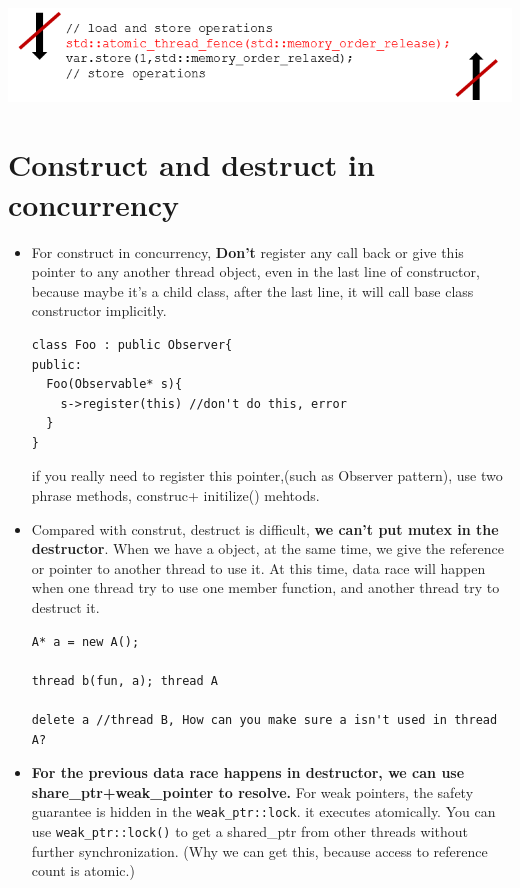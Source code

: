 \documentclass[a4paper,11pt,twoside]{book}
\begin{document}
\begin{itemize}
\begin{enumerate}
		\begin{center}
			\includegraphics[width=0.74\linewidth]{pics/release2.png}
		\end{center}
	\end{enumerate}
	
\end{itemize}


\section{Construct and destruct in concurrency}
\begin{itemize}

	\item For construct in concurrency, \textbf{Don't} register any call back or give this pointer to any another thread object, even in the last line of constructor, because maybe it's a child class, after the last line, it will call base class constructor implicitly.
\begin{lstlisting}
class Foo : public Observer{
public:
  Foo(Observable* s){
    s->register(this) //don't do this, error
  }
}
\end{lstlisting}
if you really need to register this pointer,(such as Observer pattern),  use two phrase methods, construc+ initilize() mehtods.

    \item Compared with construt, destruct is difficult, \textbf{we can't put mutex in the destructor}. When we have a object, at the same time, we give the reference or pointer to another thread to use it. At this time, data race will happen when one thread try to use one member function, and another thread try to destruct it. 
\begin{lstlisting}[]
A* a = new A();

thread b(fun, a); thread A

delete a //thread B, How can you make sure a isn't used in thread A? 
\end{lstlisting}

	\item \textbf{For the previous data race happens in destructor, we can use share\_ptr+weak\_pointer to resolve.} For weak pointers, the safety guarantee is hidden in the \texttt{weak\_ptr::lock}. it executes atomically.  You can use \texttt{weak\_ptr::lock()} to get a shared\_ptr from other threads without further synchronization. (Why we can get this, because access to reference count is atomic.) 
	

\end{itemize}
\end{document}
